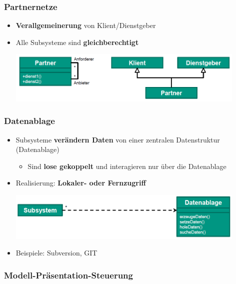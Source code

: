 \subsubsection{Partnernetze}
			
\begin{itemize}
\item \textbf{Verallgemeinerung} von Klient/Dienstgeber
\item Alle Subsysteme sind \textbf{gleichberechtigt}
\begin{center}
\includegraphics[width=0.9\textwidth]{../images/partnernetze.png}
\end{center}
\end{itemize}
			
\subsubsection{Datenablage}
			
\begin{itemize}
\item Subsysteme \textbf{verändern Daten} von einer zentralen Datenstruktur (Datenablage)
\begin{itemize}
\item Sind \textbf{lose gekoppelt} und interagieren nur über die Datenablage
\end{itemize}
\item Realisierung: \textbf{Lokaler- oder Fernzugriff}
\begin{center}
\includegraphics[width=0.9\textwidth]{../images/datenablage.png}
\end{center}
\item Beispiele: Subversion, GIT
\end{itemize}
	
\subsubsection{Modell-Präsentation-Steuerung}
			
